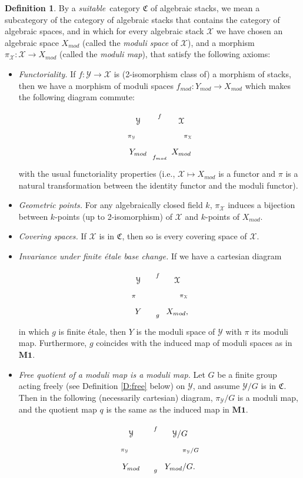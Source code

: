 \documentclass{amsart}
\theoremstyle{definition}
\newtheorem{defn}[thm]{Definition}
\theoremstyle{remark}
\theoremstyle{remark}
\newcommand{\X}{\mathcal{X}}
\newcommand{\Y}{\mathcal{Y}}
\newcommand{\Xm}{X_{mod}}
\newcommand{\Ym}{Y_{mod}}
\let\:=\colon
\begin{document}
\begin{defn}{\label{D:suitable}}
By a {\sl suitable}\, category $\mathfrak{C}$ of algebraic stacks,
we mean a subcategory of the category of algebraic stacks that
contains the category of algebraic spaces, and in which for every
algebraic stack $\X$ we have chosen an algebraic space $\Xm$
(called the {\sl moduli space} of $\X$), and a morphism $\pi_{\X}
\: \X \to \Xm$ (called the {\sl moduli map}), that satisfy the
following axioms:

\begin{itemize}
\item[$\mathbf{M1.}$] {\it Functoriality.} If $f \: \Y \to \X$ is
(2-isomorphism class of) a morphism of stacks, then we have a
morphism of moduli spaces $f_{mod} \: \Ym \to \Xm$ which makes the
following diagram commute:

$$\xymatrix{ \Y \ar[r]^f \ar[d]_{\pi_{\Y}}  &   \X
\ar[d]^{\pi_{\X}} \\
           \Ym \ar[r]_{f_{mod}}           &   \Xm}$$
   with the usual functoriality properties (i.e., $\X \mapsto \Xm$ is
   a functor and $\pi$ is a natural transformation
   between the identity functor and the moduli functor).

\item[$\mathbf{M2.}$]{\it Geometric points.} For any algebraically closed
field $k$, $\pi_{\X}$ induces a bijection
 between $k$-points (up to 2-isomorphism) of $\X$ and $k$-points of $\Xm$.

\item[$\mathbf{M3.}$]{\it Covering spaces.} If $\X$ is in $\mathfrak{C}$,  then
so is every  covering  space  of $\X$.

\item[$\mathbf{M4.}$] {\it Invariance under finite \'{e}tale base change.}
If we have a cartesian diagram

$$\xymatrix{ \Y \ar[r]^f \ar[d]_{\pi}  &   \X \ar[d]^{\pi_{\X}} \\
           Y \ar[r]_g           &   \Xm,}  $$
in which $g$ is finite \'{e}tale, then $Y$ is the moduli space of
$\Y$ with  $\pi$ its   moduli map. Furthermore, $g$ coincides with
the induced map of moduli spaces as in $\mathbf{M1}$.

\item[$\mathbf{M5.}$] {\it Free quotient of a moduli map is a moduli map.}
Let $G$ be a finite group acting freely (see Definition
\ref{D:free} below) on $\Y$, and assume $\Y/G$ is in
$\mathfrak{C}$. Then in the following (necessarily cartesian)
diagram, $\pi_{\Y}/G$ is a moduli map, and the quotient map $q$ is
the same as the induced map in $\mathbf{M1}$.

$$\xymatrix{ \Y \ar[d]_{\pi_{\Y}} \ar[r]^f & \Y/G
\ar[d]^{\pi_{\Y}/G} \\
             \Ym \ar[r]_g                & \Ym/G. }$$

\end{itemize}
\end{defn}
\end{document}
